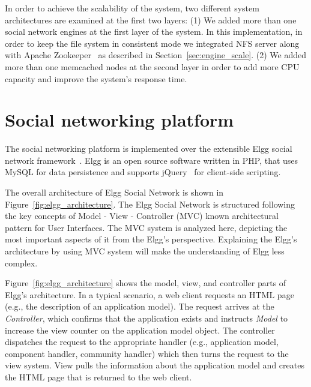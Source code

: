 In order to achieve the scalability of the system, two different system architectures are examined at the first two layers: (1) We added more than one social network engines at the first layer of the system. In this implementation, in order to keep the file system in consistent mode we integrated NFS server along with Apache Zookeeper~\cite{zookeeper_url} as described in Section~\ref{sec:engine_scale}. (2) We added more than one memcached nodes at the second layer in order to add more CPU capacity and improve the system's response time.

\section{Social networking platform}
\label{sec:implementaion_of_social_netowrk}
The social networking platform is implemented over the extensible Elgg social network framework~\cite{elgg_url}.  Elgg is an open source software written in PHP, that uses MySQL for data persistence and supports jQuery~\cite{jquery_url} for client-side scripting.  

The overall architecture of Elgg Social Network is shown in Figure~\ref{fig:elgg_architecture}. The Elgg Social Network is structured following the key concepts of Model - View - Controller (MVC) known architectural pattern for User Interfaces. The MVC system is analyzed here, depicting the most important aspects of it from the Elgg's perspective. Explaining the Elgg's architecture by using MVC system will make the understanding of Elgg less complex.

Figure~\ref{fig:elgg_architecture} shows the model, view, and controller parts of Elgg's architecture. In a typical scenario, a web client requests an HTML page (e.g., the description of an application model).  The request arrives at the \emph{Controller}, which confirms that the application exists and instructs \emph{Model} to increase the view counter on the application model object. The controller dispatches the request to the appropriate handler (e.g., application model, component handler, community handler) which then turns the request to the view system. View pulls the information about the application model and creates the HTML page that is returned to the web client.

